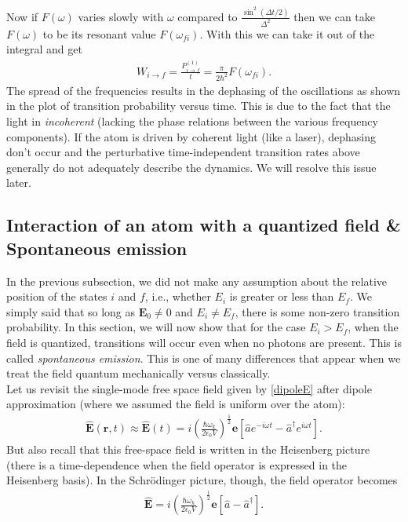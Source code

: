 \documentclass{book}
\theoremstyle{definition}
\newcommand{\f}[2]{\frac{#1}{#2}}
\newcommand{\lp}{\left(}
\newcommand{\rp}{\right)}
\newcommand{\lb}{\left[}
\newcommand{\rb}{\right]}
\begin{document}
Now if $F(\omega)$ varies slowly with $\omega$ compared to $\f{\sin^2(\Delta t/2)}{\Delta^2}$ then we can take $F(\omega)$ to be its resonant value $F(\omega_{fi})$. With this we can take it out of the integral and get
\begin{align}
W_{i\to f} = \f{P^{(1)}_{i\to f}}{t} = \f{\pi}{2\hbar^2}F(\omega_{fi}).
\end{align}
The spread of the frequencies results in the dephasing of the oscillations as shown in the plot of transition probability versus time. This is due to the fact that the light in \textit{incoherent} (lacking the phase relations between the various frequency components). If the atom is driven by coherent light (like a laser), dephasing don't occur and the perturbative time-independent transition rates above generally do not adequately describe the dynamics. We will resolve this issue later. 






 
\subsection{Interaction of an atom with a quantized field \& Spontaneous emission}

In the previous subsection, we did not make any assumption about the relative position of the states $i$ and $f$, i.e., whether $E_i$ is greater or less than $E_f$. We simply said that so long as $\mathbf{E}_0 \neq 0$ and $E_i \neq E_f$, there is some non-zero transition probability. In this section, we will now show that for the case $E_i > E_f$, when the field is quantized, transitions will occur even when no photons are present. This is called \textit{spontaneous emission}. This is one of many differences that appear when we treat the field quantum mechanically versus classically. \\

Let us revisit the single-mode free space field given by \eqref{dipoleE} after dipole approximation (where we assumed the field is uniform over the atom):
\begin{align}
\hat{\mathbf{E}}(\mathbf{r},t)  \approx \hat{\mathbf{E}}(t) = i \lp \f{\hbar\omega_k}{2\epsilon_0 V} \rp^{\f{1}{2}}\mathbf{e} \lb \hat{a}e^{-i\omega t} - \hat{a}^\dagger e^{i\omega t} \rb.
\end{align}
But also recall that this free-space field is written in the Heisenberg picture (there is a time-dependence when the field operator is expressed in the Heisenberg basis). In the Schr\"{o}dinger picture, though, the field operator becomes
\begin{align}
\hat{\mathbf{E}} = i \lp \f{\hbar\omega_k}{2\epsilon_0 V} \rp^{\f{1}{2}}\mathbf{e} \lb \hat{a} - \hat{a}^\dagger \rb.
\end{align}
\end{document}
